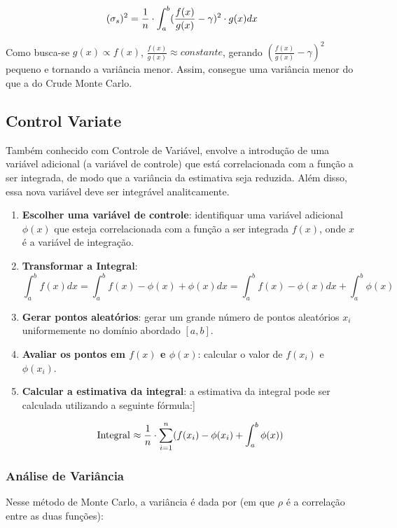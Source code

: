 \documentclass{article}
\begin{document}
\[
\text(\sigma_{s})^2 = \frac{1}{n}\cdot\int_a^b(\frac{f(x)}{g(x)} - \gamma)^2\cdot g(x)dx
\]

Como busca-se $g(x) \propto f(x)$, $\frac{f(x)}{g(x)} \approx constante$, gerando $(\frac{f(x)}{g(x)} - \gamma)^2$ pequeno e tornando a variância menor. Assim, consegue uma variância menor do que a do Crude Monte Carlo.

\subsection{Control Variate}
 Também conhecido com Controle de Variável, envolve a introdução de uma variável adicional (a variável de controle) que está correlacionada com a função a ser integrada, de modo que a variância da estimativa seja reduzida. Além disso, essa nova variável deve ser integrável analitcamente. 

\begin{enumerate}
  \item \textbf{Escolher uma variável de controle}: identifiquar uma variável adicional $\phi(x)$ que esteja correlacionada com a função a ser integrada $f(x)$, onde $x$ é a variável de integração.
  
  \item \textbf{Transformar a Integral}:
  \[
  \text{$\int_a^b f(x) dx = \int_a^b f(x) - \phi(x) + \phi(x)  dx = \int_a^b f(x) - \phi(x) dx + \int_a^b\phi(x)$}
  \]

  \item \textbf{Gerar pontos aleatórios}: gerar um grande número de pontos aleatórios $x_i$ uniformemente no domínio abordado $[a, b]$.

  \item \textbf{Avaliar os pontos em $f(x)$ e $\phi(x)$}: calcular o valor de $f(x_i)$ e $\phi(x_i)$.

  \item \textbf{Calcular a estimativa da integral}: a estimativa da integral pode ser calculada utilizando a seguinte fórmula:]

  \[
  \text{Integral $ \approx \frac{1}{n} \cdot \sum_{i=1}^{n}$} (f(x_i) - \phi(x_i) + \int_a^b\phi(x))
  \]
  
\end{enumerate}

\subsubsection{Análise de Variância}
Nesse método de Monte Carlo, a variância é dada por (em que $\rho$ é a correlação entre as duas funções):
\end{document}

